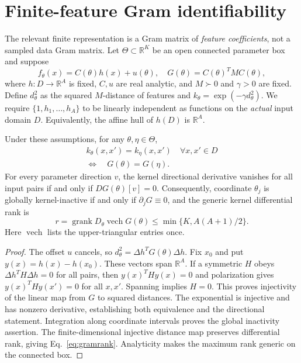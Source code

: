 \section{Finite-feature Gram identifiability}
\label{sec:gram}
The relevant finite representation is a Gram matrix of \emph{feature
coefficients}, not a sampled data Gram matrix. Let $\Theta\subset\mathbb R^K$
be an open connected parameter box and suppose
\begin{equation}
 f_\theta(x)=C(\theta)h(x)+u(\theta),\quad
 G(\theta)=C(\theta)^T M C(\theta),\label{eq:coefficientgram}
\end{equation}
where $h:D\to\mathbb R^A$ is fixed, $C,u$ are real analytic, and
$M\succ0$ and $\gamma>0$ are fixed. Define $d_\theta^2$ as the
squared $M$-distance of features and $k_\theta=\exp(-\gamma d_\theta^2)$.
We require $\{1,h_1,\ldots,h_A\}$ to be linearly independent as
functions on the \emph{actual} input domain $D$. Equivalently, the
affine hull of $h(D)$ is $\mathbb R^A$.

\begin{theorem}\label{thm:gram}
Under these assumptions, for any $\theta,\eta\in\Theta$,
\begin{equation}
 \begin{gathered}
 k_\theta(x,x')=k_\eta(x,x')\quad\forall x,x'\in D\\
 \Longleftrightarrow\quad G(\theta)=G(\eta).
 \end{gathered}
\end{equation}
For every parameter direction $v$, the kernel directional derivative
vanishes for all input pairs if and only if $D G(\theta)[v]=0$.
Consequently, coordinate $\theta_j$ is globally kernel-inactive if
and only if $\partial_jG\equiv0$, and the generic kernel differential
rank is
\begin{equation}
 r=\operatorname{grank}D_\theta\operatorname{vech}G(\theta)
 \le \min\{K,A(A+1)/2\}.\label{eq:gramrank}
\end{equation}
Here $\operatorname{vech}$ lists the upper-triangular entries once.
\end{theorem}
\begin{proof}
The offset $u$ cancels, so $d_\theta^2=\Delta h^T G(\theta)\Delta h$.
Fix $x_0$ and put $y(x)=h(x)-h(x_0)$. These vectors span $\mathbb R^A$.
If a symmetric $H$ obeys $\Delta h^TH\Delta h=0$ for all pairs, then
$y(x)^THy(x)=0$ and polarization gives $y(x)^THy(x')=0$ for all
$x,x'$. Spanning implies $H=0$. This proves injectivity of the linear
map from $G$ to squared distances. The exponential is injective and
has nonzero derivative, establishing both equivalence and the
directional statement. Integration along coordinate intervals proves
the global inactivity assertion. The finite-dimensional injective
distance map preserves differential rank, giving Eq.~\eqref{eq:gramrank}.
Analyticity makes the maximum rank generic on the connected box.
\end{proof}

